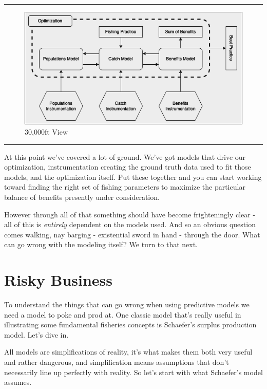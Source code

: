 \documentclass[11pt,a5paper]{book}
\begin{document}
\noindent \rule{\textwidth}{0.5pt} 
\begin{figure}[h!] 
  \includegraphics[width=\linewidth]{drawings/high_level.png}
  \caption{30,000ft View}
  \label{fig:high_level}
\end{figure}
\newline
\rule{\textwidth}{0.5pt} 
\vspace{5pt}

At this point we've covered a lot of ground. We've got models that drive our optimization, instrumentation creating the ground truth data used to fit those models, and the optimization itself. Put these together and you can start working toward finding the right set of fishing parameters to maximize the particular balance of benefits presently under consideration. 
\newline

However through all of that something should have become frighteningly clear - all of this is \textit{entirely} dependent on the models used. And so an obvious question comes walking, nay barging - existential sword in hand - through the door. What can go wrong with the modeling itself? We turn to that next. 
\newpage

\chapter{Risky Business}
To understand the things that can go wrong when using predictive models we need a model to poke and prod at. One classic model that's really useful in illustrating some fundamental fisheries concepts is Schaefer's surplus production model. Let's dive in.
\newline

All models are simplifications of reality, it's what makes them both very useful and rather dangerous, and simplification means assumptions that don't necessarily line up perfectly with reality. So let's start with what Schaefer's model assumes. 
\newline
\end{document}
